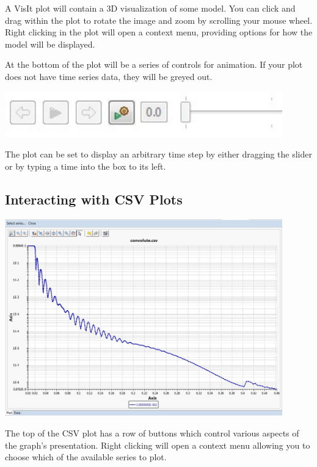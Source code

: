 \documentclass{article}
\begin{document}
A VisIt plot will contain a 3D visualization of some model. You can click and
drag within the plot to rotate the image and zoom by scrolling your mouse wheel.
Right clicking in the plot will open a context menu, providing options for how
the model will be displayed.

At the bottom of the plot will be a series of controls for animation. If your
plot does not have time series data, they will be greyed out. 

\begin{center}
\includegraphics[width=12cm]{images/TimeSliderWidget} 
\end{center}

The plot can be set to display an arbitrary time step by either dragging the
slider or by typing a time into the box to its left.

\subsection{Interacting with CSV Plots}

\begin{center}
\includegraphics[width=12cm]{images/CSVGraph}
\end{center}

The top of the CSV plot has a row of buttons which control various aspects of
the graph's presentation. Right clicking will open a context menu allowing you
to choose which of the available series to plot.
\end{document}

